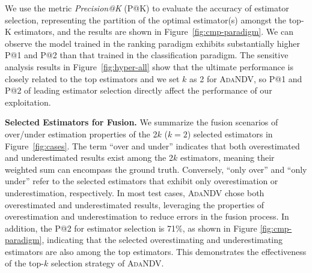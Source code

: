 We use the metric \textit{Precision@K} (P@K) to evaluate the accuracy {of estimator selection}, representing the partition of the optimal estimator(s) amongst the top-K estimators, and the results are shown in Figure~\ref{fig:cmp-paradigm}. We can observe the model trained in the ranking paradigm exhibits substantially higher P@1 and P@2 than that trained in the classification paradigm.
The sensitive analysis results in Figure~\ref{fig:hyper-all} show that the ultimate performance is closely related to the top estimators and we set $k$ as 2 for \textsc{AdaNDV}, so P@1 and P@2 of leading estimator selection directly affect the performance of our exploitation. 







\noindent\textbf{{Selected Estimators for Fusion.}}
{We summarize the fusion scenarios of over/under estimation properties of the 2$k$ ($k=2$) selected estimators in Figure~\ref{fig:cases}. The term ``over and under'' indicates that both overestimated and underestimated results exist among the 2$k$ estimators, meaning their weighted sum can encompass the ground truth. Conversely, ``only over'' and ``only under'' refer to the selected estimators that exhibit only overestimation or underestimation, respectively. In most test cases, \textsc{AdaNDV} chose both overestimated and underestimated results, leveraging the properties of overestimation and underestimation to reduce errors in the fusion process. 
In addition, the P@2 for estimator selection is 71\%, as shown in Figure \ref{fig:cmp-paradigm}, indicating that the selected overestimating and underestimating estimators are also among the top estimators.
This demonstrates the effectiveness of the top-$k$ selection strategy of \textsc{AdaNDV}.}





